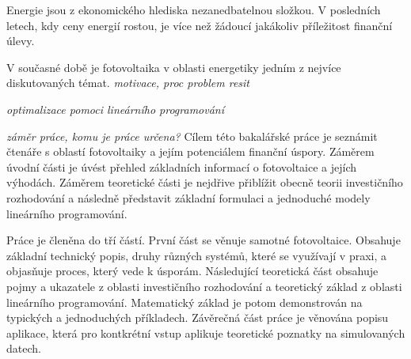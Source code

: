 Energie jsou z ekonomického hlediska nezanedbatelnou složkou.
V posledních letech, kdy ceny energií rostou, je více než žádoucí jakákoliv příležitost finanční úlevy.

V současné době je fotovoltaika v oblasti energetiky jedním z nejvíce diskutovaných témat.
\textit{motivace, proc problem resit}

\textit{optimalizace pomoci lineárního programování}

\textit{záměr práce, komu je práce určena?}
Cílem této bakalářské práce je seznámit čtenáře s oblastí fotovoltaiky a jejím potenciálem finanční úspory.
Záměrem úvodní části je úvést přehled základních informací o fotovoltaice a jejích výhodách.
Záměrem teoretické části je nejdřive přiblížit obecně teorii investičního rozhodování a následně představit základní formulaci a jednoduché modely lineárního programování.

Práce je členěna do tří částí.
První část se věnuje samotné fotovoltaice.
Obsahuje základní technický popis, druhy různých systémů, které se využívají v praxi, a objasňuje proces, který vede k úsporám.
Následující teoretická část obsahuje pojmy a ukazatele z oblasti investičního rozhodování a teoretický základ z oblasti lineárního programování.
Matematický základ je potom demonstrován na typických a jednoduchých příkladech.
Závěrečná část práce je věnována popisu aplikace, která pro kontkrétní vstup aplikuje teoretické poznatky na simulovaných datech.

